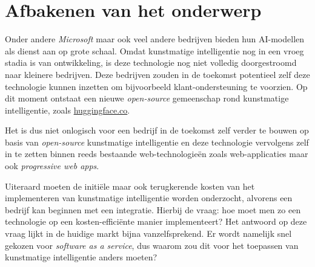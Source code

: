 \section{Afbakenen van het onderwerp}

Onder andere \textit{Microsoft} maar ook veel andere bedrijven bieden hun AI-modellen als dienst aan op grote schaal. Omdat kunstmatige intelligentie nog in een vroeg stadia is van ontwikkeling, is deze technologie nog niet volledig doorgestroomd naar kleinere bedrijven. Deze bedrijven zouden in de toekomst potentieel zelf deze technologie kunnen inzetten om bijvoorbeeld klant-ondersteuning te voorzien. Op dit moment ontstaat een nieuwe \textit{open-source} gemeenschap rond kunstmatige intelligentie, zoals \href{https://huggingface.co/}{huggingface.co}.

\bigbreak{}

Het is dus niet onlogisch voor een bedrijf in de toekomst zelf verder te bouwen op basis van \textit{open-source} kunstmatige intelligentie en deze technologie vervolgens zelf in te zetten binnen reeds bestaande web-technologieën zoals web-applicaties maar ook \textit{progressive web apps}.

\bigbreak{}

Uiteraard moeten de initiële maar ook terugkerende kosten van het implementeren van kunstmatige intelligentie worden onderzocht, alvorens een bedrijf kan beginnen met een integratie. Hierbij de vraag: hoe moet men zo een technologie op een kosten-efficiënte manier implementeert? Het antwoord op deze vraag lijkt in de huidige markt bijna vanzelfsprekend. Er wordt namelijk snel gekozen voor \textit{software as a service}, dus waarom zou dit voor het toepassen van kunstmatige intelligentie anders moeten?



\section{}%
\label{sec:probleemstelling}



